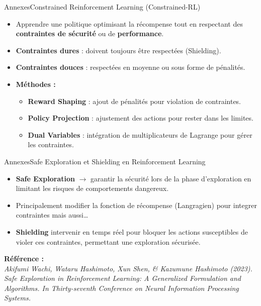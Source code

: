 \begin{frame}{Annexes}{Constrained Reinforcement Learning (Constrained-RL)}
    
    \begin{itemize}
        \item Apprendre une politique optimisant la récompense tout en respectant des \textbf{contraintes de sécurité} ou de \textbf{performance}.
        
        \item \textbf{Contraintes dures} : doivent toujours être respectées (Shielding).
        \item \textbf{Contraintes douces} : respectées en moyenne ou sous forme de pénalités.
        
        \item \textbf{Méthodes :}
            \begin{itemize}
                \item \textbf{Reward Shaping} : ajout de pénalités pour violation de contraintes.
                \item \textbf{Policy Projection} : ajustement des actions pour rester dans les limites.
                \item \textbf{Dual Variables} : intégration de multiplicateurs de Lagrange pour gérer les contraintes.
            \end{itemize}
            
    \end{itemize}    
\end{frame}

\begin{frame}{Annexes}{Safe Exploration et Shielding en Reinforcement Learning}
    
    \begin{itemize}
        \item \textbf{Safe Exploration} $\rightarrow$ garantir la sécurité lors de la phase d'exploration en limitant les risques de comportements dangereux.
        \item Principalement modifier la fonction de récompense (Langragien) pour integrer contraintes mais aussi\dots
        \item \textbf{Shielding} intervenir en temps réel pour bloquer les actions susceptibles de violer ces contraintes, permettant une exploration sécurisée.
    \end{itemize}
    
    \textbf{Référence :} \\
    \textit{Akifumi Wachi, Wataru Hashimoto, Xun Shen, \& Kazumune Hashimoto (2023). Safe Exploration in Reinforcement Learning: A Generalized Formulation and Algorithms. In Thirty-seventh Conference on Neural Information Processing Systems.}

\end{frame}

